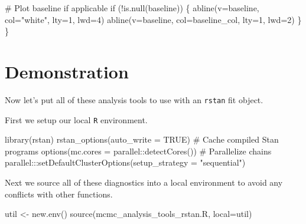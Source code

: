 \documentclass[
  letterpaper,
  DIV=11,
  numbers=noendperiod]{scrartcl}
\newenvironment{Shaded}{\begin{snugshade}}{\end{snugshade}}
\newcommand{\AttributeTok}[1]{\textcolor[rgb]{0.40,0.45,0.13}{#1}}
\newcommand{\CommentTok}[1]{\textcolor[rgb]{0.37,0.37,0.37}{#1}}
\newcommand{\ConstantTok}[1]{\textcolor[rgb]{0.56,0.35,0.01}{#1}}
\newcommand{\ControlFlowTok}[1]{\textcolor[rgb]{0.00,0.23,0.31}{#1}}
\newcommand{\DecValTok}[1]{\textcolor[rgb]{0.68,0.00,0.00}{#1}}
\newcommand{\FunctionTok}[1]{\textcolor[rgb]{0.28,0.35,0.67}{#1}}
\newcommand{\KeywordTok}[1]{\textcolor[rgb]{0.00,0.23,0.31}{#1}}
\newcommand{\NormalTok}[1]{\textcolor[rgb]{0.00,0.23,0.31}{#1}}
\newcommand{\OperatorTok}[1]{\textcolor[rgb]{0.37,0.37,0.37}{#1}}
\newcommand{\OtherTok}[1]{\textcolor[rgb]{0.00,0.23,0.31}{#1}}
\newcommand{\SpecialCharTok}[1]{\textcolor[rgb]{0.37,0.37,0.37}{#1}}
\newcommand{\StringTok}[1]{\textcolor[rgb]{0.13,0.47,0.30}{#1}}
\begin{document}
\begin{Shaded}
\begin{Highlighting}[]
  \CommentTok{\# Plot baseline if applicable}
  \ControlFlowTok{if}\NormalTok{ (}\OperatorTok{!}\KeywordTok{is}\NormalTok{.null(baseline)) \{}
\NormalTok{    abline(v}\OperatorTok{=}\NormalTok{baseline, col}\OperatorTok{=}\StringTok{"white"}\NormalTok{, lty}\OperatorTok{=}\DecValTok{1}\NormalTok{, lwd}\OperatorTok{=}\DecValTok{4}\NormalTok{)}
\NormalTok{    abline(v}\OperatorTok{=}\NormalTok{baseline, col}\OperatorTok{=}\NormalTok{baseline\_col, lty}\OperatorTok{=}\DecValTok{1}\NormalTok{, lwd}\OperatorTok{=}\DecValTok{2}\NormalTok{)}
\NormalTok{  \}}
\NormalTok{\}}
\end{Highlighting}
\end{Shaded}

\section{Demonstration}\label{demonstration}

Now let's put all of these analysis tools to use with an \texttt{rstan}
fit object.

First we setup our local \texttt{R} environment.

\begin{Shaded}
\begin{Highlighting}[]
\FunctionTok{library}\NormalTok{(rstan)}
\FunctionTok{rstan\_options}\NormalTok{(}\AttributeTok{auto\_write =} \ConstantTok{TRUE}\NormalTok{)            }\CommentTok{\# Cache compiled Stan programs}
\FunctionTok{options}\NormalTok{(}\AttributeTok{mc.cores =}\NormalTok{ parallel}\SpecialCharTok{::}\FunctionTok{detectCores}\NormalTok{()) }\CommentTok{\# Parallelize chains}
\NormalTok{parallel}\SpecialCharTok{:::}\FunctionTok{setDefaultClusterOptions}\NormalTok{(}\AttributeTok{setup\_strategy =} \StringTok{"sequential"}\NormalTok{)}
\end{Highlighting}
\end{Shaded}

Next we source all of these diagnostics into a local environment to
avoid any conflicts with other functions.

\begin{Shaded}
\begin{Highlighting}[]
\NormalTok{util }\OtherTok{\textless{}{-}} \FunctionTok{new.env}\NormalTok{()}
\FunctionTok{source}\NormalTok{(}\StringTok{\textquotesingle{}mcmc\_analysis\_tools\_rstan.R\textquotesingle{}}\NormalTok{, }\AttributeTok{local=}\NormalTok{util)}
\end{Highlighting}
\end{Shaded}
\end{document}
